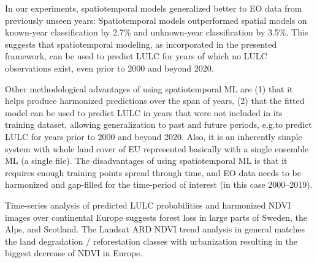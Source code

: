 In our experiments, spatiotemporal models generalized better to EO data from previously unseen years: Spatiotemporal models outperformed spatial models on known-year classification by 2.7\% and unknown-year classification by 3.5\%. This suggests that spatiotemporal modeling, as incorporated in the presented framework, can be used to predict LULC for years of which no LULC observations exist, even prior to 2000 and beyond 2020.

Other methodological advantages of using spatiotemporal ML are (1) that it helps produce harmonized predictions over the span of years, (2) that the fitted model can be used to predict LULC in years that were not included in its training dataset, allowing generalization to past and future periods, e.g.\@ to predict LULC for years prior to 2000 and beyond 2020. Also, it is an inherently simple system with whole land cover of EU represented basically with a single ensemble ML (a single file). The disadvantages of using spatiotemporal ML is that it requires enough training points spread through time, and EO data needs to be harmonized and gap-filled for the time-period of interest (in this case 2000--2019).

Time-series analysis of predicted LULC probabilities and harmonized NDVI images over continental Europe suggests forest loss in large parts of Sweden, the Alps, and Scotland. The Landsat ARD NDVI trend analysis in general matches the land degradation / reforestation classes with urbanization resulting in the biggest decrease of NDVI in Europe.